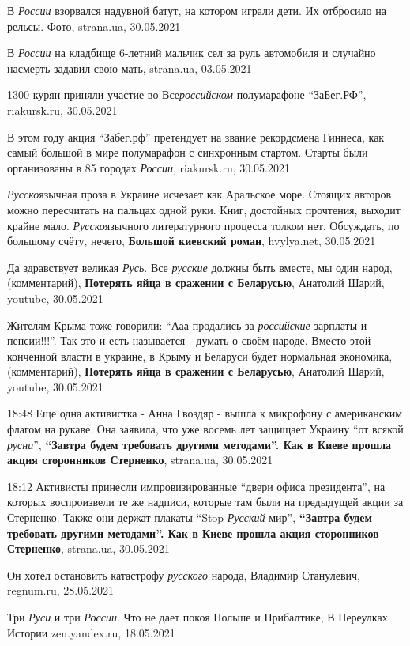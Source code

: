 В \emph{России} взорвался надувной батут, на котором играли дети. Их отбросило
на рельсы. Фото, strana.ua, 30.05.2021

В \emph{России} на кладбище 6-летний мальчик сел за руль автомобиля и случайно
насмерть задавил свою мать, strana.ua, 03.05.2021

1300 курян приняли участие во Все\emph{российском} полумарафоне
\enquote{ЗаБег.РФ}, riakursk.ru, 30.05.2021

В этом году акция \enquote{Забег.рф} претендует на звание рекордсмена Гиннеса,
как самый большой в мире полумарафон с синхронным стартом. Старты были
организованы в 85 городах \emph{России}, riakursk.ru, 30.05.2021

\emph{Русско}язычная проза в Украине исчезает как Аральское море. Стоящих
авторов можно пересчитать на пальцах одной руки. Книг, достойных прочтения,
выходит крайне мало. \emph{Русско}язычного литературного процесса толком нет.
Обсуждать, по большому счёту, нечего, \textbf{Большой киевский роман},
hvylya.net, 30.05.2021

Да здравствует великая \emph{Русь}. Все \emph{русские} должны быть вместе, мы
один народ, (комментарий), \textbf{Потерять яйца в сражении с Беларусью},
Анатолий Шарий, youtube, 30.05.2021

Жителям Крыма тоже говорили: \enquote{Ааа продались за \emph{российские} зарплаты и
пенсии!!!}. Так это и есть называется - думать о своём народе. Вместо этой
конченной власти в украине, в Крыму и Беларуси будет нормальная экономика,
(комментарий), \textbf{Потерять яйца в сражении с Беларусью}, Анатолий Шарий,
youtube, 30.05.2021

18:48  Еще одна активистка - Анна Гвоздяр - вышла к микрофону с американским
флагом на рукаве. Она заявила, что уже восемь лет защищает Украину \enquote{от
всякой \emph{русни}}, \textbf{\enquote{Завтра будем требовать другими
методами}. Как в Киеве прошла акция сторонников Стерненко}, strana.ua,
30.05.2021

18:12  Активисты принесли импровизированные \enquote{двери офиса президента},
на которых воспроизвели те же надписи, которые там были на предыдущей акции за
Стерненко. Также они держат плакаты \enquote{Stop \emph{Русский} мир},
\textbf{\enquote{Завтра будем требовать другими методами}. Как в Киеве прошла
акция сторонников Стерненко}, strana.ua, 30.05.2021

Он хотел остановить катастрофу \emph{русского} народа, Владимир Станулевич, regnum.ru, 28.05.2021

Три \emph{Руси} и три \emph{России}. Что не дает покоя Польше и Прибалтике, В
Переулках Истории zen.yandex.ru, 18.05.2021

